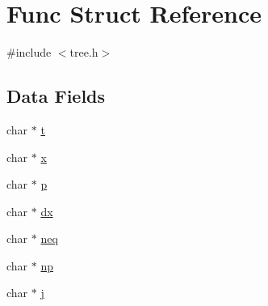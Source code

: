 \hypertarget{struct_func}{\section{Func Struct Reference}
\label{struct_func}
}


{\ttfamily \#include $<$tree.\-h$>$}

\subsection*{Data Fields}
\begin{DoxyCompactItemize}
\item 
char $\ast$ \hyperlink{struct_func_a21feba301403a65090791a94f26c9d92}{t}
\item 
char $\ast$ \hyperlink{struct_func_a87d9da60be62fb1a74b56404c392bf74}{x}
\item 
char $\ast$ \hyperlink{struct_func_aaa1ebe818ec1c763a776cc580551f3e6}{p}
\item 
char $\ast$ \hyperlink{struct_func_aa66668aed9b94cfd43d1d5fcad8e923d}{dx}
\item 
char $\ast$ \hyperlink{struct_func_a26607bec2385a751e572c5aa9976262d}{neq}
\item 
char $\ast$ \hyperlink{struct_func_ac5e9e8f42513fbf549dcde4107b633d0}{np}
\item 
char $\ast$ \hyperlink{struct_func_aabe3f0c55a8ab8de92abb1da25c055db}{j}
\end{DoxyCompactItemize}


